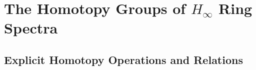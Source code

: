 \section{The Homotopy Groups of $H_{\infty}$ Ring Spectra}

\subsection{Explicit Homotopy Operations and Relations}



